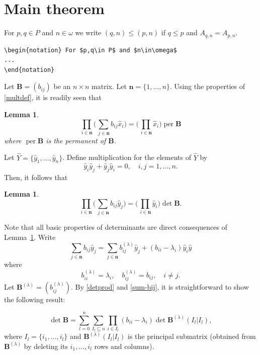 \documentclass[manuscript, printscheme]{aomart}
\newtheorem[{}\it]{thm}{Theorem}[section]
\newtheorem{lem}[thm]{Lemma}
\theoremstyle{definition}
\newtheorem*[{}\it]{notation}{Notation}
\newcommand{\wh}{\widehat}
\DeclareMathOperator{\per}{per}
\begin{document}
\section{Main theorem}
\label{s:mt}

\begin{notation} For $p,q\in P$ and $n\in\omega$ we write
$(q,n)\le(p,n)$ if $q\le p$ and $A_{q,n}=A_{p,n}$.
\begin{verbatim}
\begin{notation} For $p,q\in P$ and $n\in\omega$
...
\end{notation}
\end{verbatim}
\end{notation}

Let $\mathbf{B}=(b_{ij})$ be an $n\times n$ matrix. Let $\mathbf{n}=\{1,
\dots,n\}$. Using the properties of \eqref{multdef}, it is readily seen
that

\begin{lem}\label{lem-per}
\begin{equation}
\prod_{i\in\mathbf{n}}
\biggl(\sum_{\,j\in\mathbf{n}}b_{ij}\hat x_i\biggr)
=\biggl(\prod_{\,i\in\mathbf{n}}\hat x_i\biggr)\per \mathbf{B}
\end{equation}
where $\per \mathbf{B}$ is the permanent of $\mathbf{B}$.
\end{lem}

Let $\wh Y=\{\hat y_1,\dots,\hat y_n\}$. Define multiplication
for the elements of $\wh Y$ by
\begin{equation}
\hat y_i\hat y_j+\hat y_j\hat y_i=0,\quad i,j=1,\dots,n.
\end{equation}
Then, it follows that
\begin{lem}\label{lem-det}
\begin{equation}\label{detprod}
\prod_{i\in\mathbf{n}}
\biggl(\sum_{\,j\in\mathbf{n}}b_{ij}\hat y_j\biggr)
=\biggl(\prod_{\,i\in\mathbf{n}}\hat y_i\biggr)\det\mathbf{B}.
\end{equation}
\end{lem}

Note that all basic properties of determinants are direct consequences
of Lemma~\ref{lem-det}. Write
\begin{equation}\label{sum-bij}
\sum_{j\in\mathbf{n}}b_{ij}\hat y_j=\sum_{j\in\mathbf{n}}b^{(\lambda)}
_{ij}\hat y_j+(b_{ii}-\lambda_i)\hat y_i\hat y
\end{equation}
where
\begin{equation}
b^{(\lambda)}_{ii}=\lambda_i,\quad b^{(\lambda)}_{ij}=b_{ij},
\quad i\not=j.
\end{equation}
Let $\mathbf{B}^{(\lambda)}=(b^{(\lambda)}_{ij})$. By \eqref{detprod}
and \eqref{sum-bij}, it is
straightforward to show the following
result:
\begin{thm}\label{thm-main}
\begin{equation}\label{detB}
\det\mathbf{B}=
\sum^n_{l =0}\sum_{I_l \subseteq n}
\prod_{i\in I_l}(b_{ii}-\lambda_i)
\det\mathbf{B}^{(\lambda)}(I_l |I_l ),
\end{equation}
where $I_l =\{i_1,\dots,i_l \}$ and $\mathbf{B}^{(\lambda)}(I_l |I_l )$
is the principal submatrix (obtained from $\mathbf{B}^{(\lambda)}$
by deleting its $i_1,\dots,i_l $ rows and columns).
\end{thm}
\end{document}
